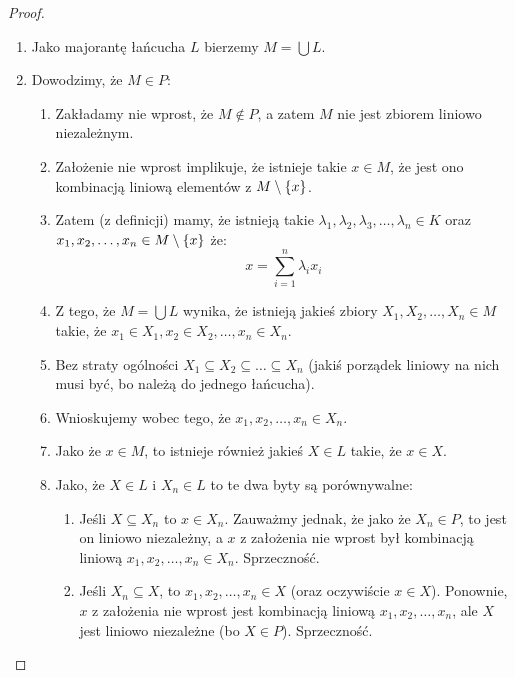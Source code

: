 \begin{proof}
	\begin{enumerate}
		\item Jako majorantę łańcucha \(L\) bierzemy \(M = \bigcup L\).
		\item Dowodzimy, że \(M \in P\):
		      \begin{enumerate}
			      \item Zakładamy nie wprost, że \(M \not \in P\), a zatem \(M\) nie jest zbiorem liniowo niezależnym.
			      \item Założenie nie wprost implikuje, że istnieje takie \(x \in M\), że jest ono kombinacją liniową  elementów z \(M \setminus \set{x}\).
			      \item Zatem (z definicji) mamy, że istnieją takie \( \lambda_1, \lambda_2, \lambda_3, \dots, \lambda_n \in K\) oraz \( x_1, x_2, \dots, x_n \in M \setminus \set{x}\) że:
			            \[
				            x = \sum_{i=1}^{n} \lambda_i x_i
			            \]
			      \item Z tego, że \(M = \bigcup L\) wynika, że istnieją jakieś zbiory \(X_1, X_2, \dots, X_n \in M\) takie, że \(x_1 \in X_1, x_2 \in X_2, \dots, x_n \in X_n\).
			      \item Bez straty ogólności \(X_1 \subseteq X_2 \subseteq \dots \subseteq X_n\) (jakiś porządek liniowy na nich musi być, bo należą do jednego łańcucha).
			      \item Wnioskujemy wobec tego, że \(x_1, x_2, \dots, x_n \in X_n\).
			      \item Jako że \(x \in M\), to istnieje również jakieś \(X \in L\) takie, że \(x \in X\).
			      \item Jako, że \(X \in L\) i \(X_n \in L\) to te dwa byty są porównywalne:
			            \begin{enumerate}
				            \item Jeśli \(X \subseteq X_n\) to \(x \in X_n\). Zauważmy jednak, że jako że \(X_n \in P\), to jest on liniowo niezależny, a \(x\) z założenia nie wprost był kombinacją liniową \(x_1, x_2, \dots, x_n \in X_n\). Sprzeczność.
				            \item Jeśli \(X_n \subseteq X\), to \(x_1, x_2, \dots, x_n \in X\) (oraz oczywiście \(x \in X\)). Ponownie, \(x\) z założenia nie wprost jest kombinacją liniową \(x_1, x_2, \dots, x_n\), ale \(X\) jest liniowo niezależne (bo \(X \in P\)). Sprzeczność.
			            \end{enumerate}
		      \end{enumerate}
	\end{enumerate}


\end{proof}
